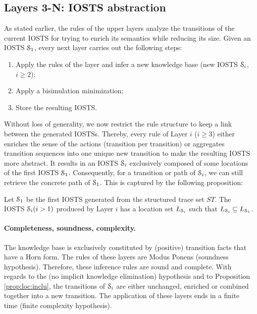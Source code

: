 \subsection{Layers 3-N: IOSTS abstraction}
\label{sec:modelinf:webapps:L4}

As stated earlier, the rules of the upper layers analyze the
transitions of the current IOSTS for trying to enrich its
semantics while reducing its size. Given an IOSTS
$\EuScript{S}_1$, every next layer carries out the following
steps:

\begin{enumerate}
\item Apply the rules of the layer and infer a new knowledge base
(new IOSTS $\EuScript{S}_i$, $i\geq 2$);

\item Apply a bisimulation minimization;

\item Store the resulting IOSTS.
\end{enumerate}

Without loss of generality, we now restrict the rule structure to
keep a link between the generated IOSTSs. Thereby, every rule of
Layer $i$ ($i \geq 3$) either enriches the sense of the actions
(transition per transition) or aggregates transition sequences
into one unique new transition to make the resulting IOSTS more
abstract. It results in an IOSTS $\EuScript{S}_i$ exclusively
composed of some locations of the first IOSTS $\EuScript{S}_1$.
Consequently, for a transition or path of $\EuScript{S}_i$, we
can still retrieve the concrete path of $\EuScript{S}_1$. This is
captured by the following proposition:

\begin{proposition}
\label{prop:loc:inclu}
Let $\EuScript{S}_1$ be the first IOSTS generated from the
structured trace set $ST$. The IOSTS $\EuScript{S}_i (i>1)$
produced by Layer $i$ has a location set $L_{\EuScript{S}_i}$
such that $L_{\EuScript{S}_i} \subseteq L_{\EuScript{S}_1}$.
\end{proposition}

\paragraph{Completeness, soundness, complexity.}

The knowledge base is exclusively constituted by (positive)
transition facts that have a Horn form. The rules of these layers
are Modus Ponens (soundness hypothesis). Therefore, these
inference rules are sound and complete. With regards to the (no
implicit knowledge elimination) hypothesis and to Proposition
\ref{prop:loc:inclu}, the transitions of $\EuScript{S}_i$ are
either unchanged, enriched or combined together into a new
transition. The application of these layers ends in a finite time
(finite complexity hypothesis).

